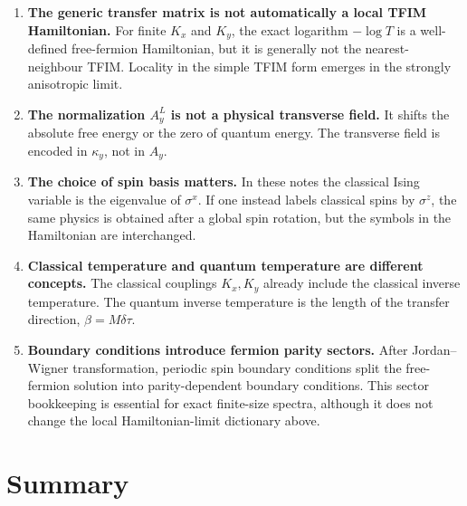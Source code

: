 \begin{enumerate}[label=(\roman*)]
    \item \textbf{The generic transfer matrix is not automatically a local
    TFIM Hamiltonian.}  For finite $K_x$ and $K_y$, the exact logarithm
    $-\log T$ is a well-defined free-fermion Hamiltonian, but it is generally not
    the nearest-neighbour TFIM.  Locality in the simple TFIM form emerges in the
    strongly anisotropic limit.

    \item \textbf{The normalization $A_y^L$ is not a physical transverse field.}
    It shifts the absolute free energy or the zero of quantum energy.  The
    transverse field is encoded in $\kappa_y$, not in $A_y$.

    \item \textbf{The choice of spin basis matters.}  In these notes the
    classical Ising variable is the eigenvalue of $\sigma^x$.  If one instead
    labels classical spins by $\sigma^z$, the same physics is obtained after a
    global spin rotation, but the symbols in the Hamiltonian are interchanged.

    \item \textbf{Classical temperature and quantum temperature are different
    concepts.}  The classical couplings $K_x,K_y$ already include the classical
    inverse temperature.  The quantum inverse temperature is the length of the
    transfer direction, $\beta=M\delta\tau$.

    \item \textbf{Boundary conditions introduce fermion parity sectors.}  After
    Jordan--Wigner transformation, periodic spin boundary conditions split the
    free-fermion solution into parity-dependent boundary conditions.  This
    sector bookkeeping is essential for exact finite-size spectra, although it
    does not change the local Hamiltonian-limit dictionary above.
\end{enumerate}

\section{Summary}
\label{sec:ising-tfim-summary}

